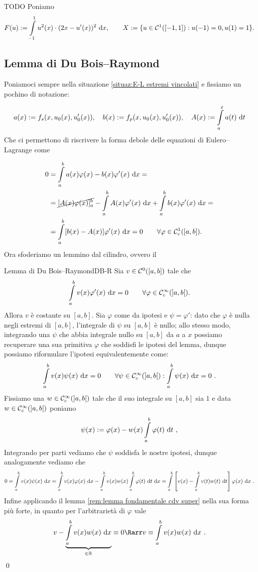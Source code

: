 \documentclass[openany]{book}
\begin{document}
\begin{example}{TODO}{}
    Poniamo
    \[ F(u) := \intop_{-1}^1 u^2(x)\cdot(2x-u'(x))^2 \de x, \qquad X := \{ u \in \mc{C}^1([-1,1]):u(-1) = 0, u(1) = 1 \}.\]
\end{example}


\subsection{Lemma di Du Bois--Raymond}

Poniamoci sempre nella situazione \ref{situaz:E-L estremi vincolati} e fissiamo un pochino di notazione:

\[a(x) := f_s(x, u_0(x), u_0'(x)), \quad b(x) := f_p(x, u_0(x), u_0'(x)), \quad A(x) := \intop_a^x a(t)\de t \]
Che ci permettono di riscrivere la forma debole delle equazioni di Eulero--Lagrange come

\[\begin{aligned}
    0 & = \intop_a^b a(x)\varphi(x) - b(x)\varphi'(x)\de x = \\ & = \cancel{[A(x)\varphi(x)]_a^b} - \intop_a^b A(x)\varphi'(x) \de x + \intop_a^b b(x)\varphi'(x) \de x = \\ & = \intop_a^b [b(x)-A(x)]\varphi'(x) \de x = 0 \qquad \forall \varphi \in \mc{C}_c^1([a,b]).
\end{aligned}\]
Ora sfoderiamo un lemmino dal cilindro, ovvero il 

\begin{lemma}{Lemma di Du Bois--Raymond}{DB-R}
    Sia $v \in \mathcal{C}^0([a,b])$ tale che 
    \[ \intop_a^b v(x) \varphi'(x) \de x = 0 \qquad \forall \varphi \in \mc{C}_c^\infty(]a,b[).\]
    Allora $v$ è costante su $[a,b]$.
    \proof 
    Sia $\varphi$ come da ipotesi e $\psi = \varphi'$: dato che $\varphi$ è nulla negli estremi di $[a,b]$, l'integrale di $\psi$ su $[a,b]$ è nullo; allo stesso modo, integrando una $\psi$ che abbia integrale nullo su $[a,b]$ da $a$ a $x$ possiamo recuperare una sua primitiva $\varphi$ che soddisfi le ipotesi del lemma, dunque possiamo riformulare l'ipotesi equivalentemente come:
    \[ \intop_a^b v(x) \psi(x) \de x = 0 \qquad \forall \psi \in \mc{C}_c^\infty(]a,b[) : \intop_a^b \psi(x) \de x = 0\ . \]
    Fissiamo una $w \in \mathcal{C}_c^\infty(]a,b[)$ tale che il suo integrale su $[a,b]$ sia $1$ e data $w \in \mathcal{C}_c^\infty(]a,b[)$ poniamo
    \[ \psi(x) := \varphi(x) - w(x) \intop_a^b\varphi(t)\de t\ ,\]
    Integrando per parti vediamo che $\psi$ soddisfa le nostre ipotesi, dunque analogamente vediamo che 
    \[ 0 = \intop_a^b v(x)\psi(x)\de x = \intop_a^b v(x)\varphi(x) \de x- \intop_a^b v(x)w(x)\intop_a^b \varphi(t)\de t \de x = \intop_a^b \left[v(x) - \intop_a^b v(t)w(t)\de t \right]\varphi(x)\de x\ . \]
    Infine applicando il lemma \ref{rem:lemma fondamentale cdv super} nella sua forma più forte, in quanto per l'arbitrarietà di $\varphi$ vale 
    \[ v - \underbrace{\intop_a^b v(x)w(x) \de x}_{\in \R} \equiv 0 \Rarr v \equiv \intop_a^b v(x)w(x) \de x\ . \]
    \qed
\end{lemma}
\end{document}
